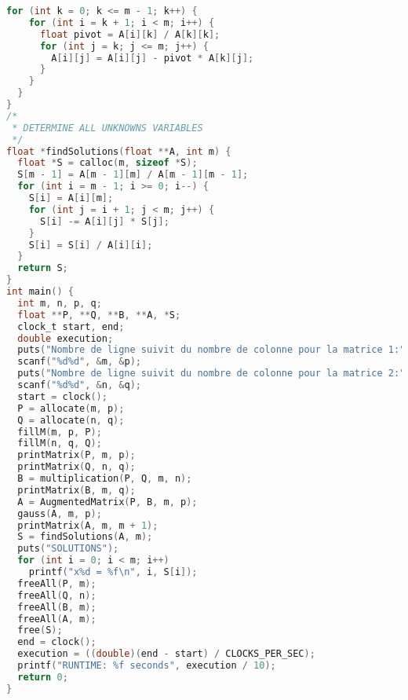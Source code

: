 \begin{lstlisting}[language=C]
  for (int k = 0; k <= m - 1; k++) {
    for (int i = k + 1; i < m; i++) {
      float pivot = A[i][k] / A[k][k];
      for (int j = k; j <= m; j++) {
        A[i][j] = A[i][j] - pivot * A[k][j];
      }
    }
  }
}
/*
 * DETERMINE ALL UNKNOWNS VARIABLES
 */
float *findSolutions(float **A, int m) {
  float *S = calloc(m, sizeof *S);
  S[m - 1] = A[m - 1][m] / A[m - 1][m - 1];
  for (int i = m - 1; i >= 0; i--) {
    S[i] = A[i][m];
    for (int j = i + 1; j < m; j++) {
      S[i] -= A[i][j] * S[j];
    }
    S[i] = S[i] / A[i][i];
  }
  return S;
}
int main() {
  int m, n, p, q;
  float **P, **Q, **B, **A, *S;
  clock_t start, end;
  double execution;
  puts("Nombre de ligne suivit du nombre de colonne pour la matrice 1:");
  scanf("%d%d", &m, &p);
  puts("Nombre de ligne suivit du nombre de colonne pour la matrice 2:");
  scanf("%d%d", &n, &q);
  start = clock();
  P = allocate(m, p);
  Q = allocate(n, q);
  fillM(m, p, P);
  fillM(n, q, Q);
  printMatrix(P, m, p);
  printMatrix(Q, n, q);
  B = multiplication(P, Q, m, n);
  printMatrix(B, m, q);
  A = AugmentedMatrix(P, B, m, p);
  gauss(A, m, p);
  printMatrix(A, m, m + 1);
  S = findSolutions(A, m);
  puts("SOLUTIONS");
  for (int i = 0; i < m; i++)
    printf("x%d = %f\n", i, S[i]);
  freeAll(P, m);
  freeAll(Q, n);
  freeAll(B, m);
  freeAll(A, m);
  free(S);
  end = clock();
  execution = ((double)(end - start) / CLOCKS_PER_SEC);
  printf("RUNTIME: %f seconds", execution / 10);
  return 0;
}

\end{lstlisting}
